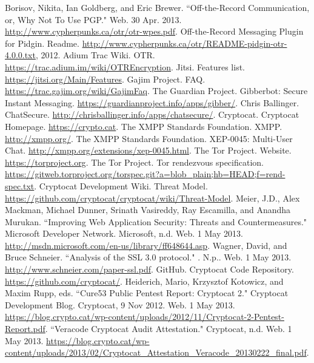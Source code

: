\documentclass[letterpaper,twocolumn,10pt]{article}
\begin{document}
\begin{thebibliography}{1}

 Borisov, Nikita, Ian Goldberg, and Eric Brewer. ``Off-the-Record Communication, or, Why Not To Use PGP." Web. 30 Apr. 2013. \url{http://www.cypherpunks.ca/otr/otr-wpes.pdf}.
 Off-the-Record Messaging Plugin for Pidgin. Readme. \url{http://www.cypherpunks.ca/otr/README-pidgin-otr-4.0.0.txt}, 2012.
 Adium Trac Wiki. OTR. \url{https://trac.adium.im/wiki/OTREncryption}.
 Jitsi. Features list. \url{https://jitsi.org/Main/Features}.
 Gajim Project. FAQ. \url{https://trac.gajim.org/wiki/GajimFaq}.
 The Guardian Project. Gibberbot: Secure Instant Messaging. \url{https://guardianproject.info/apps/gibber/}.
 Chris Ballinger. ChatSecure. \url{http://chrisballinger.info/apps/chatsecure/}.
 Cryptocat. Cryptocat Homepage. \url{https://crypto.cat}.
 The XMPP Standards Foundation. XMPP. \url{http://xmpp.org/}.
 The XMPP Standards Foundation. XEP-0045: Multi-User Chat. \url{http://xmpp.org/extensions/xep-0045.html}.
 The Tor Project. Website. \url{https://torproject.org}.
 The Tor Project. Tor rendezvous specification. \url{https://gitweb.torproject.org/torspec.git?a=blob_plain;hb=HEAD;f=rend-spec.txt}.
 Cryptocat Development Wiki. Threat Model. \url{https://github.com/cryptocat/cryptocat/wiki/Threat-Model}.
 Meier, J.D., Alex Mackman, Michael Dunner, Srinath Vasireddy, Ray Escamilla, and Anandha Murukan. ``Improving Web Application Security: Threats and Countermeasures." Microsoft Developer Network. Microsoft, n.d. Web. 1 May 2013. \url{http://msdn.microsoft.com/en-us/library/ff648644.asp}.
 Wagner, David, and Bruce Schneier. ``Analysis of the SSL 3.0 protocol." . N.p.. Web. 1 May 2013. \url{http://www.schneier.com/paper-ssl.pdf}.
 GitHub. Cryptocat Code Repository. \url{https://github.com/cryptocat/}.
 Heiderich, Mario, Krzysztof Kotowicz, and Maxim Rupp, eds. ``Cure53 Public Pentest Report: Cryptocat 2." Cryptocat Development Blog. Cryptocat, 9 Nov 2012. Web. 1 May 2013. \url{https://blog.crypto.cat/wp-content/uploads/2012/11/Cryptocat-2-Pentest-Report.pdf}.
 ``Veracode Cryptocat Audit Attestation." Cryptocat, n.d. Web. 1 May 2013. \url{https://blog.crypto.cat/wp-content/uploads/2013/02/Cryptocat_Attestation_Veracode_20130222_final.pdf}.

\end{thebibliography}
\end{document}
